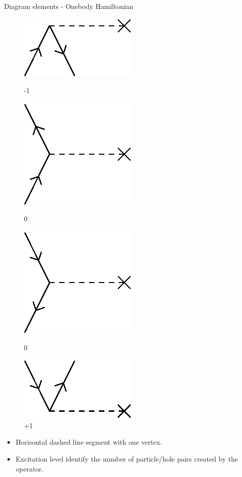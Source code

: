 \begin{frame}{Diagram elements - Onebody Hamiltonian}

    \renewcommand{\figurename}{Level}

    \begin{figure}
    \centering
    \parbox{0.20\textwidth}{
            \centering
            \includegraphics[scale=0.65]{graphics/f1}
            \caption{-1}
        }
        \parbox{0.20\textwidth}{
            \centering
            \includegraphics[scale=0.65]{graphics/f2}
            \caption{0}
        }
        \parbox{0.20\textwidth}{
            \centering
            \includegraphics[scale=0.65]{graphics/f3}
            \caption{0}
        }
        \parbox{0.20\textwidth}{
            \centering
            \includegraphics[scale=0.65]{graphics/f4}
            \caption{+1}
        }
    \end{figure}

    \begin{itemize}
        \item Horisontal dashed line segment with one vertex.
        \item Excitation level identify the number of particle/hole pairs created by the operator.
    \end{itemize}
\end{frame}

    
